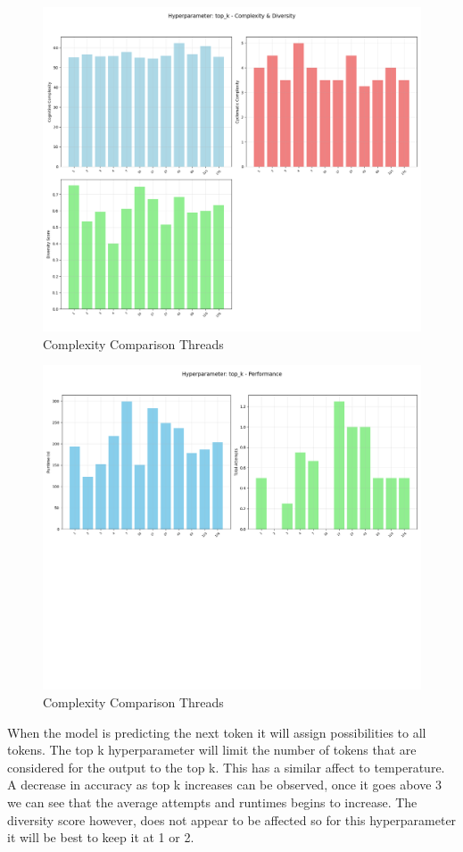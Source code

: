 \documentclass[12pt]{extarticle}
\begin{document}
\begin{figure}[H]
\centering
\includegraphics[width=0.7\linewidth]{Images/Hyperparam_top_k_Complexity.png}
\caption{Complexity Comparison Threads}
\label{fig:Complexity_Comparison_Threads}
\end{figure}

\begin{figure}[H]
\centering
\includegraphics[width=0.7\linewidth]{Images/Hyperparam_top_k_Performance.png}
\caption{Complexity Comparison Threads}
\label{fig:Complexity_Comparison_Threads}
\end{figure}

When the model is predicting the next token it will assign possibilities to all tokens. The top k hyperparameter will limit the number of tokens that are considered for the output to the top k. This has a similar affect to temperature. A decrease in accuracy as top k increases can be observed, once it goes above 3 we can see that the average attempts and runtimes begins to increase. The diversity score however, does not appear to be affected so for this hyperparameter it will be best to keep it at 1 or 2.
\end{document}
